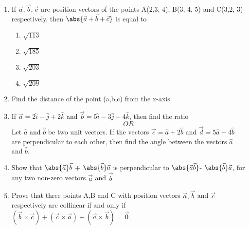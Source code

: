 



\begin{enumerate}
	\item If $ \vec{a},\vec{b}, \vec{c} $ are position vectors of the points A(2,3,-4), B(3,-4,-5) and C(3,2,-3) respectively, then $ \abs{\vec{a}+\vec{b}+\vec{c}} $ is equal to
		\begin{enumerate}
			\item $\sqrt{113}$
			\item $\sqrt{185}$
			\item $\sqrt{203}$
			\item $\sqrt{209}$
		\end{enumerate}
\item Find the distance of the point (a,b,c) from the x-axis
\item If $ \vec{a}=2\hat{i}-\hat{j}+2\hat{k} $ and $ \vec{b}=5\hat{i}-3\hat{j}-4\hat{k} $, then find the ratio
 $$ OR $$
 Let $\hat{a}$ and $\hat{b}$  be two unit vectors. If the vectors $\vec{c}=\hat{a}+2\hat{b}$ and $\vec{d}=5\hat{a}-4\hat{b}$ are perpendicular to each other, then find the angle between the vectors $\hat{a}$ and $\hat{b}$.
\item Show that $ \abs{\vec{a}} \vec{b}$ + $ \abs{\vec{b}} \vec{a}$ is perpendicular to $\abs{\vec{a} \vec{b}} $- $ \abs{\vec{b}} \vec{a} $, for any two non-zero vectors $\vec{a}$ and $\vec{b}$.
\item Prove that three points A,B and C with position vectors $\vec{a}, \vec{b}$ and $\vec{c}$ respectively are collinear if and only if $( \vec{b} \times \vec{c})+(\vec{c} \times \vec{a})+(\vec{a} \times \vec{b}) = \vec{0}$.
\end{enumerate}

